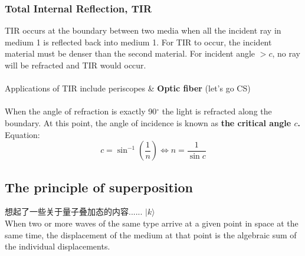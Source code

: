 \documentclass[a4paper,12pt]{article}
\begin{document}
\subsubsection*{Total Internal Reflection, TIR}
TIR occurs at the boundary between two media when all the incident ray in medium 1 is reflected back into medium 1. For TIR to occur, the incident material must be denser than the second material. For incident angle $>c$, no ray will be refracted and TIR would occur.\\\\
Applications of TIR include periscopes \&  \textbf{Optic fiber} (let's go CS)\\\\
When the angle of refraction is exactly 90$^\circ$ the light is refracted along the boundary. At this point, the angle of incidence is known as\textbf{ the critical angle \(c\).} Equation:
\[c=\sin^{-1}\left(\dfrac{1}{n}\right) \Leftrightarrow n=\dfrac{1}{\sin c}\]
\subsection{The principle of superposition}
想起了一些关于量子叠加态的内容...... $|k\rangle $\\
When two or more waves of the same type arrive at a given point in space at the same time, the displacement of the medium at that point is the algebraic sum of the individual displacements.
\begin{center}
\end{center}
\end{document}
